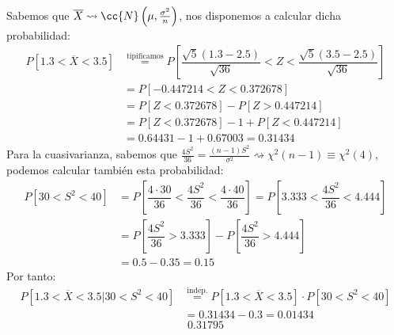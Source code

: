 \begin{ejercicio}
\begin{enumerate}[label=\alph*)]
            Sabemos que $\overline{X}\rightsquigarrow\cc{N}\left(\mu, \frac{\sigma^2}{n}\right)$, nos disponemos a calcular dicha probabilidad:
            \begin{align*}
                P[1.3<\overline{X}<3.5] &\stackrel{\text{tipificamos}}{=} P\left[\dfrac{\sqrt{5}(1.3-2.5)}{\sqrt{36}}< Z < \dfrac{\sqrt{5}(3.5-2.5)}{\sqrt{36}}\right] \\
                                        &= P[-0.447214 < Z < 0.372678] \\ 
                                        &= P[Z<0.372678] - P[Z>0.447214] \\
                                        &= P[Z<0.372678] -1 + P[Z<0.447214] \\
                                        &= 0.64431 - 1 + 0.67003 = 0.31434
            \end{align*}
            Para la cuasivarianza, sabemos que $\frac{4S^2}{36} = \frac{(n-1)S^2}{\sigma^2}\rightsquigarrow\chi^2(n-1) \equiv \chi^2(4)$, podemos calcular también esta probabilidad:
            \begin{align*}
                P[30<S^2<40] &= P\left[\dfrac{4\cdot 30}{36}<\dfrac{4S^2}{36}<\dfrac{4\cdot 40}{36}\right] = P\left[3.333 < \dfrac{4S^2}{36}<4.444\right] \\
                             &= P\left[\dfrac{4S^2}{36}>3.333\right] - P\left[\dfrac{4S^2}{36}>4.444\right] \\
                             &= 0.5 - 0.35 = 0.15
            \end{align*}
            Por tanto:
            \begin{align*}
                P[1.3 < \overline{X}<3.5 | 30<S^2<40] &\stackrel{\text{indep.}}{=} P[1.3<\overline{X}<3.5]\cdot P[30<S^2<40] \\ &= 0.31434 - 0.3 = 0.01434
            \end{align*}
            \begin{equation*}
                0.31795
            \end{equation*}
    \end{enumerate}
\end{ejercicio}


